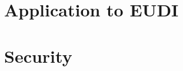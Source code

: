 \documentclass{iacrtrans}
\newcommand{\jbel}[1]{{\color{blue}{}jbel: #1}}
\begin{document}



\section{Application to EUDI}
\label{sec:appeudi}






\section{Security}
\label{sec:security}

        
\end{document}
